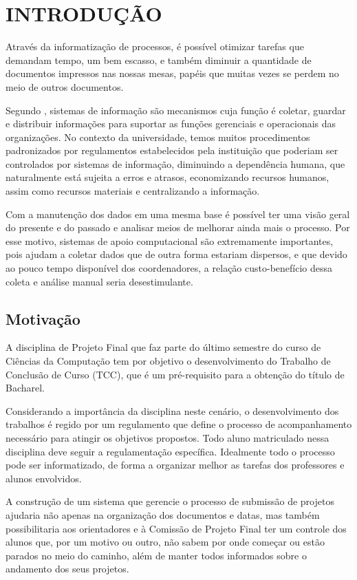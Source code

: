 \chapter{INTRODUÇÃO}
Através da informatização de processos, é possível otimizar tarefas que demandam tempo, 
um bem escasso, e também diminuir a quantidade de documentos impressos nas nossas mesas, 
papéis que muitas vezes se perdem no meio de outros documentos.

Segundo \cite{Freitas:1997}, sistemas de informação são mecanismos cuja função é coletar, guardar e 
distribuir informações para suportar as funções gerenciais e operacionais das organizações.
No contexto da universidade, temos muitos procedimentos padronizados por regulamentos estabelecidos
pela instituição que poderiam ser controlados por sistemas de informação, diminuindo a
dependência humana, que naturalmente está sujeita a erros e atrasos, economizando recursos humanos, 
assim como recursos materiais e centralizando a informação. 

Com a manutenção dos dados em uma mesma base é possível ter uma visão geral do presente 
e do passado e analisar meios de melhorar ainda mais o processo. Por esse motivo, sistemas de apoio
computacional são extremamente importantes, pois ajudam a coletar dados que de outra forma estariam
dispersos, e que devido ao pouco tempo disponível dos coordenadores, a relação custo-benefício dessa
coleta e análise manual seria desestimulante.

\section{Motivação}
A disciplina de Projeto Final que faz parte do último semestre do curso de Ciências da Computação
tem por objetivo o desenvolvimento do Trabalho de Conclusão de Curso (TCC), que é um pré-requisito para a obtenção do título de Bacharel.

Considerando a importância da disciplina neste cenário, o desenvolvimento dos trabalhos é regido por um
regulamento que define o processo de acompanhamento necessário para atingir os objetivos propostos.
Todo aluno matriculado nessa disciplina deve seguir a regulamentação específica. Idealmente todo o 
processo pode ser informatizado, de forma a organizar melhor as tarefas dos professores e alunos envolvidos.

A construção de um sistema que gerencie o processo de submissão de projetos ajudaria 
não apenas na organização dos documentos e datas, mas também possibilitaria aos 
orientadores e à Comissão de Projeto Final ter um controle dos alunos que, por um 
motivo ou outro, não sabem por onde começar ou estão parados no meio do caminho, 
além de manter todos informados sobre o andamento dos seus projetos.

